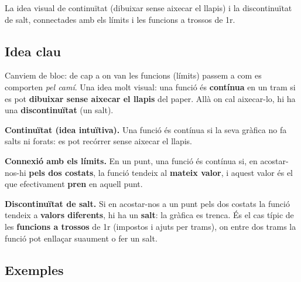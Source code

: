 %
{La idea visual de continuïtat (dibuixar sense aixecar el llapis) i la discontinuïtat de salt, connectades amb els límits i les funcions a trossos de 1r.}

\subsection{Idea clau}

Canviem de bloc: de cap a on van les funcions (límits) passem a com es comporten
\emph{pel camí}. Una idea molt visual: una funció és \textbf{contínua} en un tram si
es pot \textbf{dibuixar sense aixecar el llapis} del paper. Allà on cal aixecar-lo,
hi ha una \textbf{discontinuïtat} (un salt).

\begin{idea}
\textbf{Continuïtat (idea intuïtiva).} Una funció és contínua si la seva gràfica no fa
salts ni forats: es pot recórrer sense aixecar el llapis.

\textbf{Connexió amb els límits.} En un punt, una funció és contínua si, en
acostar-nos-hi \textbf{pels dos costats}, la funció tendeix al \textbf{mateix valor},
i aquest valor és el que efectivament \textbf{pren} en aquell punt.

\textbf{Discontinuïtat de salt.} Si en acostar-nos a un punt pels dos costats la funció
tendeix a \textbf{valors diferents}, hi ha un \textbf{salt}: la gràfica es trenca. És
el cas típic de les \textbf{funcions a trossos} de 1r (impostos i ajuts per trams),
on entre dos trams la funció pot enllaçar suaument o fer un salt.
\end{idea}

\subsection{Exemples}

